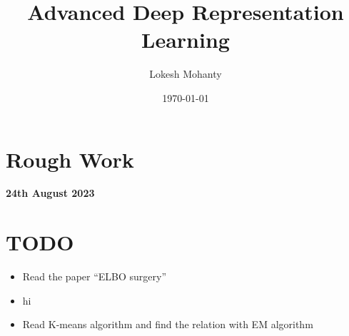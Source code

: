 \documentclass[11pt]{article}
\author{Lokesh Mohanty}
\date{\today}
\title{Advanced Deep Representation Learning}
\begin{document}
\maketitle
\tableofcontents

\clearpage
\section{Rough Work}

\textbf{24th August 2023}


\section{TODO}
\label{sec:todo}

\begin{itemize}
\item Read the paper ``ELBO surgery''
  \item hi
\item Read K-means algorithm and find the relation with EM algorithm
\end{itemize}
\end{document}
